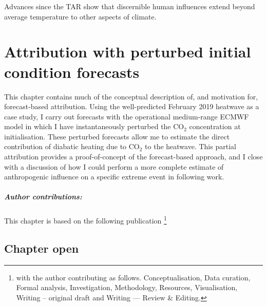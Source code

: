 {\onehalfspacing%
\begin{savequote}[8cm]
  Advances since the TAR show that discernible human influences extend beyond average temperature to other aspects of climate.
\end{savequote}
    
\chapter{\label{ch3}Attribution with perturbed initial condition forecasts}

This chapter contains much of the conceptual description of, and motivation for, forecast-based attribution. Using the well-predicted February 2019 heatwave as a case study, I carry out forecasts with the operational medium-range ECMWF model in which I have instantaneously perturbed the CO$_2$ concentration at initialisation. These perturbed forecasts allow me to estimate the direct contribution of diabatic heating due to CO$_2$ to the heatwave. This partial attribution provides a proof-of-concept of the forecast-based approach, and I close with a discussion of how I could perform a more complete estimate of anthropogenic influence on a specific extreme event in following work.
{\small\paragraph{Author contributions:} This chapter is based on the following publication \footnote{with the author contributing as follows. Conceptualisation, Data curation, Formal analysis, Investigation, Methodology, Resources, Visualisation, Writing -- original draft and Writing --- Review \& Editing.} \par\vspace{1em}
}

\clearpage

\minitoc

\clearpage}

\section{Chapter open}\label{ch3:open}

